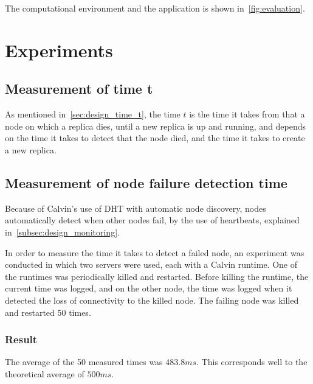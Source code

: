 \documentclass{cslthse-msc}
\begin{document}
The computational environment and the application is shown in~\autoref{fig:evaluation}.


\section{Experiments}

\subsection{Measurement of time t} \label{sec:eval_time_t}
As mentioned in~\autoref{sec:design_time_t}, the time $t$ is the time it takes from that a node on which a replica dies, until a new replica is up and running, and depends on the time it takes to detect that the node died, and the time it takes to create a new replica.

\subsection{Measurement of node failure detection time} \label{subsec:eval_node_fail_time}
Because of Calvin's use of DHT with automatic node discovery, nodes automatically detect when other nodes fail, by the use of heartbeats, explained in~\autoref{subsec:design_monitoring}.

In order to measure the time it takes to detect a failed node, an experiment was conducted in which two servers were used, each with a Calvin runtime. One of the runtimes was periodically killed and restarted. Before killing the runtime, the current time was logged, and on the other node, the time was logged when it detected the loss of connectivity to the killed node. The failing node was killed and restarted 50 times.

\subsubsection*{Result}
The average of the 50 measured times was $483.8 ms$. This corresponds well to the theoretical average of $500 ms$. %
\end{document}

